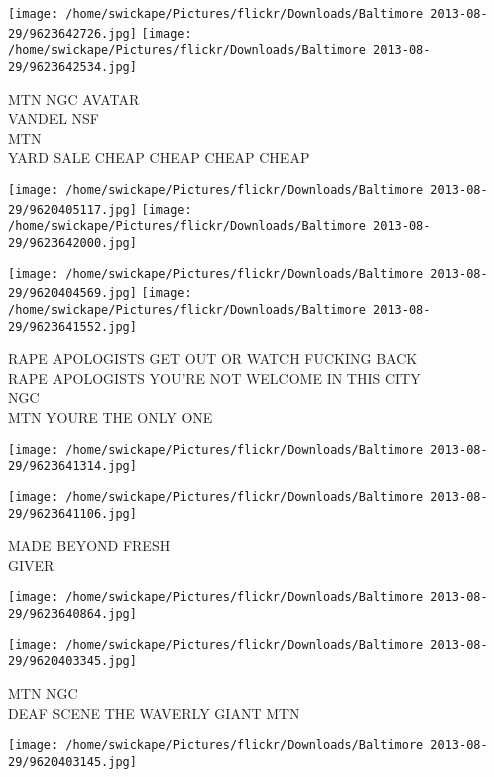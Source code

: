 \documentclass[10pt,letterpaper]{article}
\begin{document}
\texttt{[image: /home/swickape/Pictures/flickr/Downloads/Baltimore 2013-08-29/9623642726.jpg]}
\texttt{[image: /home/swickape/Pictures/flickr/Downloads/Baltimore 2013-08-29/9623642534.jpg]}

MTN NGC AVATAR\\
VANDEL NSF\\
MTN\\
YARD SALE CHEAP CHEAP CHEAP CHEAP\\
\pagebreak

\texttt{[image: /home/swickape/Pictures/flickr/Downloads/Baltimore 2013-08-29/9620405117.jpg]}
\texttt{[image: /home/swickape/Pictures/flickr/Downloads/Baltimore 2013-08-29/9623642000.jpg]}

\texttt{[image: /home/swickape/Pictures/flickr/Downloads/Baltimore 2013-08-29/9620404569.jpg]}
\texttt{[image: /home/swickape/Pictures/flickr/Downloads/Baltimore 2013-08-29/9623641552.jpg]}

RAPE APOLOGISTS GET OUT OR WATCH FUCKING BACK\\
RAPE APOLOGISTS YOU'RE NOT WELCOME IN THIS CITY\\
NGC\\
MTN YOURE THE ONLY ONE\\
\pagebreak

\texttt{[image: /home/swickape/Pictures/flickr/Downloads/Baltimore 2013-08-29/9623641314.jpg]}

\vspace{0.25in}
\texttt{[image: /home/swickape/Pictures/flickr/Downloads/Baltimore 2013-08-29/9623641106.jpg]}

MADE BEYOND FRESH\\
GIVER\\
\pagebreak

\texttt{[image: /home/swickape/Pictures/flickr/Downloads/Baltimore 2013-08-29/9623640864.jpg]}

\vspace{0.25in}
\texttt{[image: /home/swickape/Pictures/flickr/Downloads/Baltimore 2013-08-29/9620403345.jpg]}

MTN NGC\\
DEAF SCENE THE WAVERLY GIANT MTN\\
\pagebreak

\texttt{[image: /home/swickape/Pictures/flickr/Downloads/Baltimore 2013-08-29/9620403145.jpg]}
\end{document}
